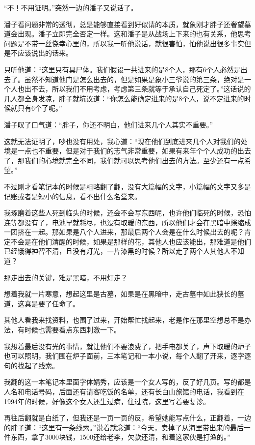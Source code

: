 “不！不用证明。”突然一边的潘子又说话了。

潘子看问题非常的透彻，总是能够直接看到好似请的本质，就象刚才胖子还奢望墓道会出现。潘子立即完全否定一样。这和潘子是从战场上下来的也有关系，他思考问题是不带一丝侥幸心里的，所以我一听他说话，就很害怕，怕他说出很多事实但是不应该说出的话来。

只听他道：“这里只有具尸体。我们假设一共进来的是8个人，那有6个人必然是出去了。虽然不知道他门是怎么出去的，但是如果是象小三爷说的第三条，绝对是一个人也出不去，所以我们不用考虑，考虑第三条就等于承认自己死定了。”这话说的几人都全身发凉，胖子就坑议道：“你怎么能确定进来的是8个人，说不定进来的时候就只有6个了呢。”

潘子叹了口气道：“胖子，你还不明白，他们进来几个人其实不重要。”

这就无法证明了，吵也没有用处，我心道：“现在他们到底进来几个人对我们的处境是一点也不重要，但是对于我们的志气非常重要，如果有来年个个人成功的出去了，那我们的心境就完全不同，我们就可以思考他们出去的方法。至少还有一点希望。”

不过刚才看笔记本的时候是粗略翻了翻，没有大篇幅的文字，小篇幅的文字又多是记账或者是短小的信息，看不出什么名堂来。

我琢磨着这些人死到临头的时候，还会不会写东西呢，也许他们临死的时候，恐怕连等都没有了，电池早就耗尽，也没有取暖的东西，所以他们才会在黑暗中蜷缩成一团挤在一起。那如果是八个人进来，那最后两个人会是在什么时候出去的呢？肯定不会是在他们清醒的时候，如果是那样的花，其他人也应该能出，那难道是他们已经饿得神智不清，且没有灯光，一片漆黑的时候？所以走了两个人其他人不知道？

那走出去的关键，难是黑暗，不用灯走？

想着我就一片寒意，想起这里是古墓，如果是在黑暗中，走古墓中如此狭长的墓道，这真是要了任命了。

其他人看我来找资料，也围了过来，开始帮忙找起来，老是作在那里空想总不是办法，有时候也需要看点东西刺激一下。

我想着最后没有光的事情，就让他们不要浪费了，把手电都关了，声下取暖的炉子也可以照明，我们围在炉子面前，三本笔记和一本小说，每个人翻了开来，逐字逐句的找起了线索。

我翻的这一本笔记本里面字体娟秀，应该是一个女人写的，反了好几页。写的都是人名和电话号码，后面还有请客吃饭的名单，还有长白山旅馆的电话，我看到在1994年的时候，好像这个女人还生过病，住过院，这里写着要复诊。

再往后翻就是白纸了，但我还是一页一页的反，希望她能写点什么，正翻着，一边的胖子道：“这里有一条线索。”说着就念道：“今天，卖掉了从海里带出来的最后一件东西，拿了3000块钱，1500还给老李，欠款还清，和着这家伙是打渔的。”

